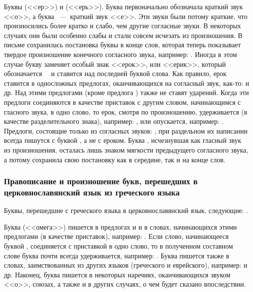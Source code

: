 \documentclass[11pt,a4paper,oneside]{memoir}
\begin{document}
    Буквы {} (<<ер>>) и {} (<<ерь>>). Буква {} первоначально обозначала краткий звук <<о>>, а буква {}~---~краткий звук <<е>>. Эти звуки были потому краткие, что произносились более кратко и слабо, чем другие согласные звуки. В некоторых случаях они были особенно слабы и стали совсем исчезать из произношения. В письме сохранилась постановка буквы {} в конце слов, которая теперь показывает твердое произношение конечного согласного звука, например: {}. Иногда в этом случае букву {} заменяет особый знак <<ерок>>, или <<ерик>>, который обозначается~~{} и ставится над последней буквой слова. Как правило, ерок ставится в односложных предлогах, оканчивающихся на согласный звук, как-то: {} и др. Над этими предлогами (кроме предлога {}) также не ставят ударений. Когда эти предлоги соединяются в качестве приставок с другим словом, начинающимся с гласного звука, в одно слово, то ерок, смотря по произношению, удерживается (в качестве разделительного знака), например: {}, или опускается, например: {}. Предлоги, состоящие только из согласных звуков: {}, при раздельном их написании всегда пишутся с буквой {}, а не с ероком. Буква {}, исчезнувшая как гласный звук из произношения, осталась лишь знаком мягкости предыдущего согласного звука, а потому сохранила свою постановку как в середине, так и на конце слов.

                \subsubsection{Правописание и произношение букв, перешедших в церковнославянский язык из греческого языка}

    Буквы, перешедшие с греческого языка в церковнославянский язык, следующие: {}.

    Буква {} (<<омега>>) пишется в предлогах {} и {} и в словах, начинающихся этими предлогами (в качестве приставок), например: {}. Если слово, начинающееся буквой {}, соединяется с приставкой в одно слово, то в полученном составном слове буква {} почти всегда удерживается, например: {}. Буква {} пишется также в словах, заимствованных из других языков (греческого и еврейского), например: {} и др. Наконец, буква {} пишется в некоторых наречиях, оканчивающихся звуком <<о>>, союзах, а также и в других случаях, о чем будет сказано впоследствии.
\end{document}
